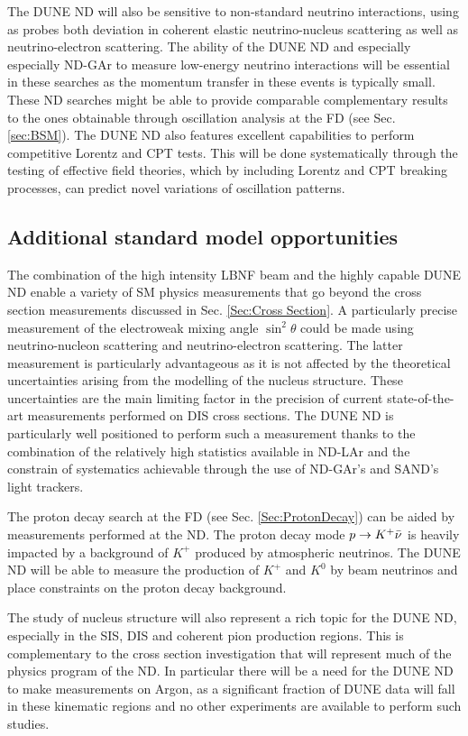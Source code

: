 The DUNE ND will also be sensitive to non-standard neutrino interactions, using as probes both deviation in coherent elastic neutrino-nucleus scattering as well as neutrino-electron scattering. The ability of the DUNE ND and especially especially ND-GAr to measure low-energy neutrino interactions will be essential in these searches as the momentum transfer in these events is typically small. These ND searches might be able to provide comparable complementary results to the ones obtainable through oscillation analysis at the FD (see Sec. \ref{sec:BSM}). The DUNE ND also features excellent capabilities to perform competitive Lorentz and CPT tests. This will be done systematically through the testing of effective field theories, which by including Lorentz and CPT breaking processes, can predict novel variations of oscillation patterns.

\subsection{Additional standard model opportunities}
\label{Sec:ND-SM}
The combination of the high intensity LBNF beam and the highly capable DUNE ND enable a variety of SM physics measurements that go beyond the cross section measurements discussed in Sec. \ref{Sec:Cross Section}. A particularly precise measurement of the electroweak mixing angle $\sin^2\theta$ could be made using neutrino-nucleon scattering and neutrino-electron scattering. The latter measurement is particularly advantageous as it is not affected by the theoretical uncertainties arising from the modelling of the nucleus structure. These uncertainties are the main limiting factor in the precision of current state-of-the-art measurements performed on DIS cross sections. The DUNE ND is particularly well positioned to perform such a measurement thanks to the combination of the relatively high statistics available in ND-LAr and the constrain of systematics achievable through the use of ND-GAr's and SAND's light trackers.

The proton decay search at the FD (see Sec. \ref{Sec:ProtonDecay}) can be aided by measurements performed at the ND. The proton decay mode $p\rightarrow K^+ \Bar{\nu}$ is heavily impacted by a background of $K^+$ produced by atmospheric neutrinos. The DUNE ND will be able to measure the production of $K^+$ and $K^0$ by beam neutrinos and place constraints on the proton decay background. 

The study of nucleus structure will also represent a rich topic for the DUNE ND, especially in the SIS, DIS and coherent pion production regions. This is complementary to the cross section investigation that will represent much of the physics program of the ND. In particular there will be a need for the DUNE ND to make measurements on Argon, as a significant fraction of DUNE data will fall in these kinematic regions and no other experiments are available to perform such studies.